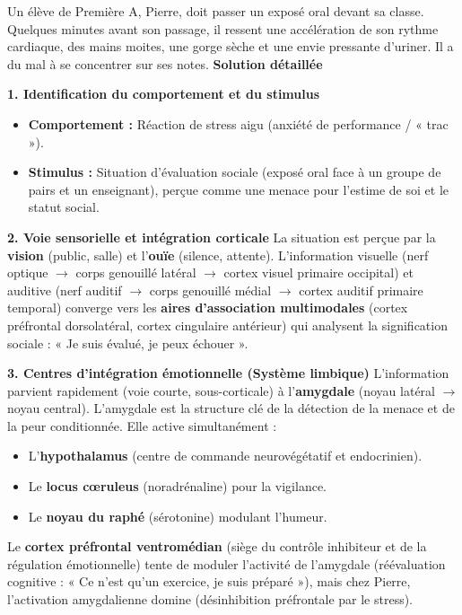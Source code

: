 \documentclass[11pt]{article}
\begin{document}
\begin{exoresolu}
Un élève de Première A, Pierre, doit passer un exposé oral devant sa classe. Quelques minutes avant son passage, il ressent une accélération de son rythme cardiaque, des mains moites, une gorge sèche et une envie pressante d'uriner. Il a du mal à se concentrer sur ses notes.
\tcblower
\textbf{Solution détaillée}

\textbf{1. Identification du comportement et du stimulus}
\begin{itemize}
    \item \textbf{Comportement :} Réaction de stress aigu (anxiété de performance / « trac »).
    \item \textbf{Stimulus :} Situation d'évaluation sociale (exposé oral face à un groupe de pairs et un enseignant), perçue comme une menace pour l'estime de soi et le statut social.
\end{itemize}

\textbf{2. Voie sensorielle et intégration corticale}
La situation est perçue par la \textbf{vision} (public, salle) et l'\textbf{ouïe} (silence, attente). L'information visuelle (nerf optique $\to$ corps genouillé latéral $\to$ cortex visuel primaire occipital) et auditive (nerf auditif $\to$ corps genouillé médial $\to$ cortex auditif primaire temporal) converge vers les \textbf{aires d'association multimodales} (cortex préfrontal dorsolatéral, cortex cingulaire antérieur) qui analysent la signification sociale : « Je suis évalué, je peux échouer ».

\textbf{3. Centres d'intégration émotionnelle (Système limbique)}
L'information parvient rapidement (voie courte, sous-corticale) à l'\textbf{amygdale} (noyau latéral $\to$ noyau central). L'amygdale est la structure clé de la détection de la menace et de la peur conditionnée. Elle active simultanément :
\begin{itemize}
    \item L'\textbf{hypothalamus} (centre de commande neurovégétatif et endocrinien).
    \item Le \textbf{locus cœruleus} (noradrénaline) pour la vigilance.
    \item Le \textbf{noyau du raphé} (sérotonine) modulant l'humeur.
\end{itemize}
Le \textbf{cortex préfrontal ventromédian} (siège du contrôle inhibiteur et de la régulation émotionnelle) tente de moduler l'activité de l'amygdale (réévaluation cognitive : « Ce n'est qu'un exercice, je suis préparé »), mais chez Pierre, l'activation amygdalienne domine (désinhibition préfrontale par le stress).


\end{exoresolu}
\end{document}
